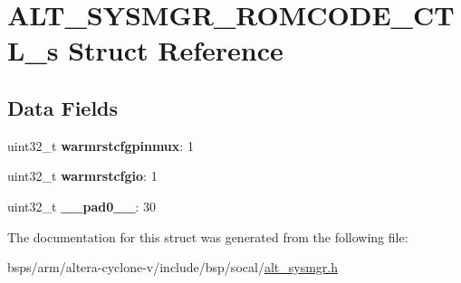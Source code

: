 \hypertarget{structALT__SYSMGR__ROMCODE__CTL__s}{}\section{A\+L\+T\+\_\+\+S\+Y\+S\+M\+G\+R\+\_\+\+R\+O\+M\+C\+O\+D\+E\+\_\+\+C\+T\+L\+\_\+s Struct Reference}
\label{structALT__SYSMGR__ROMCODE__CTL__s}
\subsection*{Data Fields}
\begin{DoxyCompactItemize}
\item 
\mbox{\label{structALT__SYSMGR__ROMCODE__CTL__s_a05e0987afb794a6fd7a7925c9022aca7}} 
uint32\+\_\+t {\bfseries warmrstcfgpinmux}\+: 1
\item 
\mbox{\label{structALT__SYSMGR__ROMCODE__CTL__s_a881669141c24f937240c18c8d545911d}} 
uint32\+\_\+t {\bfseries warmrstcfgio}\+: 1
\item 
\mbox{\label{structALT__SYSMGR__ROMCODE__CTL__s_ad4c56758a7a34193e911b18483e11595}} 
uint32\+\_\+t {\bfseries \+\_\+\+\_\+pad0\+\_\+\+\_\+}\+: 30
\end{DoxyCompactItemize}


The documentation for this struct was generated from the following file\+:\begin{DoxyCompactItemize}
\item 
bsps/arm/altera-\/cyclone-\/v/include/bsp/socal/\mbox{\hyperlink{alt__sysmgr_8h}{alt\+\_\+sysmgr.\+h}}\end{DoxyCompactItemize}
